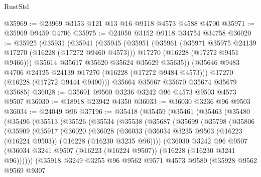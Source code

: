 \begin{lexlean}{RustStd}
\begin{coremodule}
@35969 := @23969 @3153 @121 @13 @16 @9118 @4573 @4588 @4700
@35971 := @35969 @9459 @4706
@35975 := @24050 @3152 @9118 @34754 @34758
@36020 := @35925
    (@35931
      (@35941
        (@35945
          (@35951
            (@35961
              (@35971 @35975 @24139 @17270 (@16228 (@17272 @9460 @4573)))
              @17270
              (@16228 (@17272 @9451 @9466)))
            @35614
            @35617
            @35620
            @35624
            @35629
            @35635))
        (@35646 @9483 @4706 @24125 @24139 @17270 (@16228 (@17272 @9484 @4573)))
        @17270
        (@16228 (@17272 @9444 @9490)))
      @35664
      @35667
      @35670
      @35674
      @35679
      @35685)
@36028 := @35691 @9500 @3236 @3242 @96 @4573 @9503 @4573 @9507
@36030 := @18918 @23942 @4350
@36033 := @36030 @3236 @96 @9503
@36034 := @24049 @96
@37196 := @35418
    (@35459
      (@35461
        (@35463
          (@35480
            (@35496
              (@35513
                (@35526
                  (@35534
                    (@35538
                      (@35687
                        (@35699
                          (@35798
                            (@35806
                              (@35909
                                (@35917
                                  (@36020
                                    (@36028
                                      (@36033
                                        (@36034
                                          @3235
                                          @9503
                                          (@16223 (@16224 @9503))
                                          (@16228 (@16230 @3235 @96))))
                                      (@36030
                                        @3242
                                        @96
                                        @9507
                                        (@36034
                                          @3241
                                          @9507
                                          (@16223 (@16224 @9507))
                                          (@16228 (@16230 @3241 @96))))))
                                  (@35918
                                    @3249
                                    @3255
                                    @96
                                    @9562
                                    @9571
                                    @4573
                                    @9580
                                    (@35928
                                      @9562
                                      @9569
                                      @9307

\end{coremodule}
\end{lexlean}
